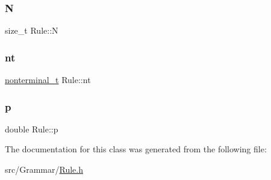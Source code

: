 \mbox{\label{class_rule_a0a2a742af39b60831ad1ac5eb5ba7498}} 
\subsubsection{\texorpdfstring{N}{N}}
{\footnotesize\ttfamily size\+\_\+t Rule\+::N}

\mbox{\label{class_rule_a980385e76137909454bd6a585bd2e138}} 
\subsubsection{\texorpdfstring{nt}{nt}}
{\footnotesize\ttfamily \hyperlink{_nonterminal_8h_a1c5bfe9b903f69c83bbde5da7035fef3}{nonterminal\+\_\+t} Rule\+::nt}

\mbox{\label{class_rule_acd7e4d41d59dec76f60ca16238ab391a}} 
\subsubsection{\texorpdfstring{p}{p}}
{\footnotesize\ttfamily double Rule\+::p}



The documentation for this class was generated from the following file\+:\begin{DoxyCompactItemize}
\item 
src/\+Grammar/\hyperlink{_rule_8h}{Rule.\+h}\end{DoxyCompactItemize}
